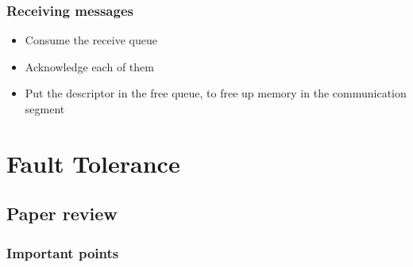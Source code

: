 \documentclass[a4paper]{article}
\begin{document}
\subsubsection{Receiving messages}

\begin{itemize}
\item
    Consume the receive queue
\item
    Acknowledge each of them
\item
    Put the descriptor in the free queue, to free up memory in the
    communication segment
\end{itemize}

\newpage

\section{Fault Tolerance}

\subsection{Paper review}

\subsubsection{Important points}
\end{document}
